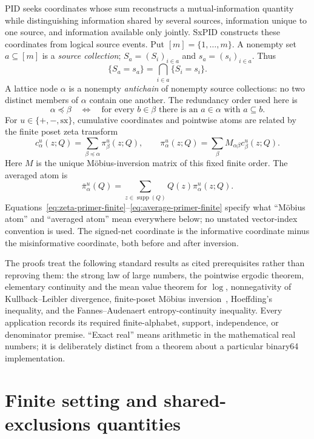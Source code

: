 \documentclass[11pt]{article}
\theoremstyle{definition}
\newcommand{\supp}{\operatorname{supp}}
\newcommand{\sx}{\mathrm{sx}}
\begin{document}
PID seeks coordinates whose sum reconstructs a mutual-information quantity while distinguishing
information shared by several sources, information unique to one source, and information available
only jointly.  SxPID constructs these coordinates from logical source events.  Put
$[m]=\{1,\ldots,m\}$.  A nonempty set $a\subseteq[m]$ is a \emph{source collection};
$S_a=(S_i)_{i\in a}$ and $s_a=(s_i)_{i\in a}$.  Thus
\[
  \{S_a=s_a\}=\bigcap_{i\in a}\{S_i=s_i\}.
\]
A lattice node $\alpha$ is a nonempty \emph{antichain} of nonempty source collections: no two
distinct members of $\alpha$ contain one another.  The redundancy order used here is
\[
  \alpha\preceq\beta
  \quad\Longleftrightarrow\quad
  \text{for every }b\in\beta\text{ there is an }a\in\alpha\text{ with }a\subseteq b.
\]
For $u\in\{+,-,\sx\}$, cumulative coordinates and pointwise atoms are related by the finite
poset zeta transform
\begin{equation}\label{eq:zeta-primer-finite}
  c^u_\alpha(z;Q)
  =\sum_{\beta\preceq\alpha}\pi^u_\beta(z;Q),
  \qquad
  \pi^u_\alpha(z;Q)
  =\sum_\beta M_{\alpha\beta}c^u_\beta(z;Q).
\end{equation}
Here $M$ is the unique M{\"o}bius-inversion matrix of this fixed finite order.  The averaged atom is
\begin{equation}\label{eq:average-primer-finite}
  \bar\pi^u_\alpha(Q)
  =\sum_{z\in\supp(Q)}Q(z)\pi^u_\alpha(z;Q).
\end{equation}
Equations~\eqref{eq:zeta-primer-finite}--\eqref{eq:average-primer-finite} specify what ``M{\"o}bius
atom'' and ``averaged atom'' mean everywhere below; no unstated vector-index convention is used.
The signed-net coordinate is the informative coordinate minus the misinformative coordinate, both
before and after inversion.

The proofs treat the following standard results as cited prerequisites rather than reproving them:
the strong law of large numbers, the pointwise ergodic theorem, elementary continuity and the mean
value theorem for $\log$, nonnegativity of Kullback--Leibler divergence, finite-poset M{\"o}bius
inversion~\cite{rota1964}, Hoeffding's inequality, and the Fannes--Audenaert
entropy-continuity inequality.
Every application records its required finite-alphabet, support, independence, or denominator
premise.  ``Exact real'' means arithmetic in the mathematical real numbers; it is deliberately
distinct from a theorem about a particular binary64 implementation.

\section{Finite setting and shared-exclusions quantities}
\end{document}
